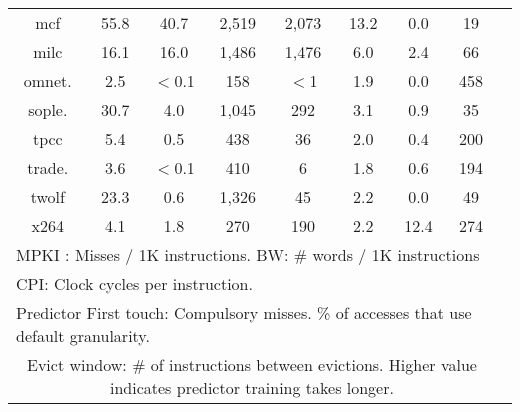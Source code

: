 \begin{table}[!h]
{\begin{tabular}[!h]{|@{~}c@{~}||@{~}c@{~}|@{~}c@{~}||@{~}c@{~}|@{~}c@{~}|@{~}c@{~}|@{~}c@{~}|@{~}c@{~}|@{~}c|}
mcf       &    55.8   &    40.7    &    2,519  &    2,073    &  13.2 & 0.0 &   19 \\
milc      &    16.1   &    16.0    &    1,486  &    1,476    &  6.0  & 2.4 &   66 \\
omnet.    &    2.5    &    $<$0.1  &    158    &    $<$1     &  1.9  & 0.0 &   458 \\
sople.    &    30.7   &    4.0     &    1,045  &    292      &  3.1  & 0.9 &   35 \\
tpcc      &    5.4    &    0.5     &    438    &    36       &  2.0  & 0.4 &   200 \\
trade.    &    3.6    &    $<$0.1  &    410    &    6        &  1.8  & 0.6 &   194 \\
twolf     &    23.3   &    0.6     &    1,326  &    45       &  2.2  & 0.0 &   49 \\
x264      &    4.1    &    1.8     &    270    &    190      &  2.2  & 12.4 &  274 \\
\hline                                  
\multicolumn{8}{l}{MPKI : Misses / 1K instructions. BW: \# words / 1K instructions}\\
\multicolumn{8}{l}{CPI: Clock cycles per instruction. }\\
\multicolumn{8}{l}{Predictor First touch: Compulsory misses. \% of accesses that use default granularity. }\\
	\multicolumn{8}{p{3in}}{Evict window: \# of instructions between evictions. Higher value indicates predictor training takes longer.} \\
\end{tabular}                                                                       
}                                                                       

\end{table}                                                          





